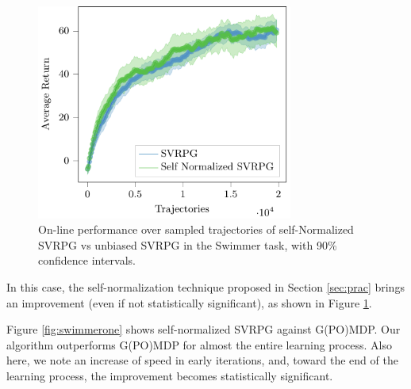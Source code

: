 \begin{figure}[h]
	\begin{minipage}[h]{1\textwidth}
		\centering
		\includegraphics[width=0.75\textwidth]{Images/Experiments/swimmer_self_normalized_SVRPG_vs_SVRPG_tex.pdf}
		\vspace{-0.1in}
		\caption{On-line performance over sampled trajectories of self-Normalized \acs{SVRPG} vs unbiased \acs{SVRPG} in the Swimmer task, with 90\% confidence intervals.}
		\label{fig:swimmertwo}
	\end{minipage}
	\vspace{-0.15in}
\end{figure}

 In this case, the self-normalization technique proposed in Section \ref{sec:prac} brings an improvement (even if not statistically significant), as shown in Figure \ref{fig:swimmertwo}.


Figure \ref{fig:swimmerone} shows self-normalized \acs{SVRPG} against G(PO)MDP. Our algorithm outperforms G(PO)MDP for almost the entire learning process. Also here, we note an increase of speed in early iterations, and, toward the end of the learning process, the improvement becomes statistically significant.

